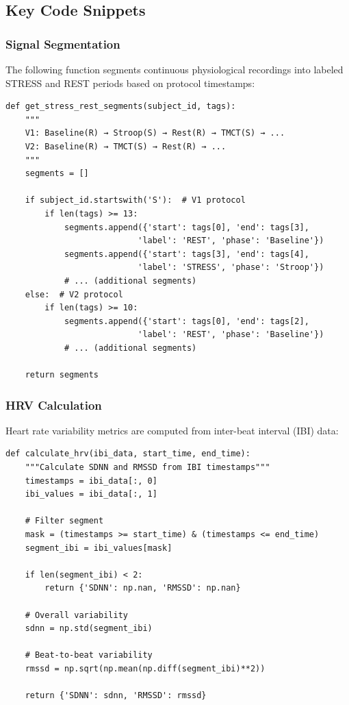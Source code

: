 \documentclass[12pt,letterpaper]{article}
\begin{document}
\subsection{Key Code Snippets}

\subsubsection{Signal Segmentation}

The following function segments continuous physiological recordings into labeled STRESS and REST periods based on protocol timestamps:

\begin{verbatim}
def get_stress_rest_segments(subject_id, tags):
    """
    V1: Baseline(R) → Stroop(S) → Rest(R) → TMCT(S) → ...
    V2: Baseline(R) → TMCT(S) → Rest(R) → ...
    """
    segments = []

    if subject_id.startswith('S'):  # V1 protocol
        if len(tags) >= 13:
            segments.append({'start': tags[0], 'end': tags[3],
                           'label': 'REST', 'phase': 'Baseline'})
            segments.append({'start': tags[3], 'end': tags[4],
                           'label': 'STRESS', 'phase': 'Stroop'})
            # ... (additional segments)
    else:  # V2 protocol
        if len(tags) >= 10:
            segments.append({'start': tags[0], 'end': tags[2],
                           'label': 'REST', 'phase': 'Baseline'})
            # ... (additional segments)

    return segments
\end{verbatim}

\subsubsection{HRV Calculation}

Heart rate variability metrics are computed from inter-beat interval (IBI) data:

\begin{verbatim}
def calculate_hrv(ibi_data, start_time, end_time):
    """Calculate SDNN and RMSSD from IBI timestamps"""
    timestamps = ibi_data[:, 0]
    ibi_values = ibi_data[:, 1]

    # Filter segment
    mask = (timestamps >= start_time) & (timestamps <= end_time)
    segment_ibi = ibi_values[mask]

    if len(segment_ibi) < 2:
        return {'SDNN': np.nan, 'RMSSD': np.nan}

    # Overall variability
    sdnn = np.std(segment_ibi)

    # Beat-to-beat variability
    rmssd = np.sqrt(np.mean(np.diff(segment_ibi)**2))

    return {'SDNN': sdnn, 'RMSSD': rmssd}
\end{verbatim}
\end{document}
